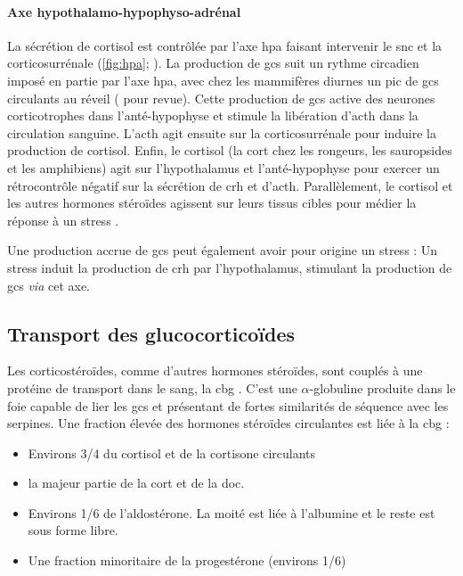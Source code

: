 \documentclass[../main.tex]{subfiles}
\begin{document}
\paragraph[Axe hypothalamo-hypophyso-adrénal]{Axe hypothalamo-hypophyso-adrénal}
La sécrétion de cortisol est contrôlée par l'axe \gls{hpa} faisant intervenir le \gls{snc} et la corticosurrénale (\autoref{fig:hpa}; \citealp{Herman1997}).
La production de \glspl{gc} suit un rythme circadien imposé en partie par l'axe \gls{hpa}, avec chez les mammifères diurnes un pic de \glspl{gc} circulants au réveil (\citealp{Dickmeis2009} pour revue).
Cette production de \glspl{gc} active des neurones corticotrophes dans l'anté-hypophyse et stimule la libération d'\gls{acth} dans la circulation sanguine.
L'\gls{acth} agit ensuite sur la corticosurrénale pour induire la production de cortisol.
Enfin, le cortisol (la \gls{cort} chez les rongeurs, les sauropsides et les amphibiens) agit sur l'hypothalamus et l'anté-hypophyse pour exercer un rétrocontrôle négatif sur la sécrétion de \gls{crh} et d'\gls{acth}.
Parallèlement, le cortisol et les autres hormones stéroïdes agissent sur leurs tissus cibles pour médier la réponse à un stress \citep{Herman1997,Tsigos2002}.
\par
Une production accrue de \glspl{gc} peut également avoir pour origine un stress :
Un stress induit la production de \gls{crh} par l'hypothalamus, stimulant la production de \glspl{gc} \textit{via} cet axe.




\subsection{Transport des glucocorticoïdes}
Les corticostéroïdes, comme d'autres hormones stéroïdes, sont couplés à une protéine de transport dans le sang, la \gls{cbg} \citep{Rosner1990}.
C'est une $\alpha$-globuline produite dans le foie capable de lier les \glspl{gc} et présentant de fortes similarités de séquence avec les serpines.
Une fraction élevée des hormones stéroïdes circulantes est liée à la \gls{cbg} \citep{Bittar1997,Becker2001}:
\begin{itemize}
\item Environs 3/4 du cortisol et de la cortisone circulants
\item la majeur partie de la \gls{cort} et de la \gls{doc}.
\item Environs 1/6 de l'aldostérone. La moité est liée à l'albumine et le reste est sous forme libre.
\item Une fraction minoritaire de la progestérone (environs 1/6)
\end{itemize}
\end{document}
